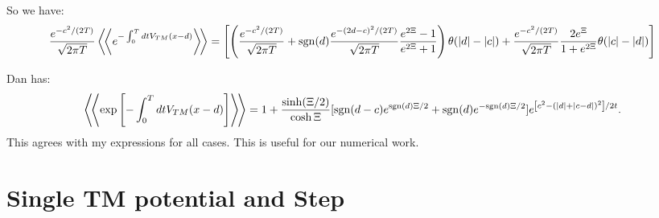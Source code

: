 So we have:
\begin{equation}
\frac{e^{-c^2/(2T)}}{\sqrt{2\pi T}} \left\langle\!\left\langle e^{-\int_0^T dt V_{TM}(x-d)}\right\rangle\!\right\rangle =  \left[\left( \frac{e^{-c^2/(2T)}}{\sqrt{2\pi T}}  + \mathrm{sgn}(d)\dfrac{e^{-(2d-c)^2/(2T)}}{\sqrt{2\pi T}}\dfrac{e^{2\Xi}-1}{e^{2\Xi} +1}\right)\theta(|d|-|c|) + \frac{e^{-c^2/(2T)}}{\sqrt{2\pi T}}\dfrac{2e^\Xi}{1 + e^{2\Xi}}\theta(|c|-|d|) \right]
\end{equation} 

Dan has:
\begin{equation}
\left\langle\!\left\langle \exp\left[-\int_0^T dt V_{TM}(x-d)\right]\right\rangle\!\right\rangle = 1 + \frac{\sinh(\Xi/2)}{\cosh\Xi}[\mathrm{sgn}(d-c)e^{\mathrm{sgn}(d)\Xi/2} + \mathrm{sgn}(d)e^{-\mathrm{sgn}(d)\Xi/2}]e^{\left[c^2-(|d|+|c-d|)^2\right]/2t}.
\end{equation}
This agrees with my expressions for all cases.  This is useful for our numerical work.  

\section{Single  TM potential and Step}

